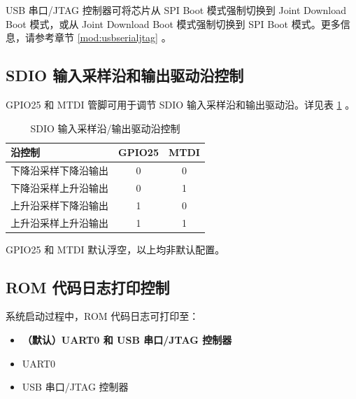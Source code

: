 \documentclass[main\_\_CN.tex]{subfiles}
\begin{document}
USB 串口/JTAG 控制器可将芯片从 SPI Boot 模式强制切换到 Joint Download Boot 模式，或从 Joint Download Boot 模式强制切换到 SPI Boot 模式。更多信息，请参考章节 \ref{mod:usbserialjtag} \textit{}。

\subsection{SDIO 输入采样沿和输出驱动沿控制}

GPIO25 和 MTDI 管脚可用于调节 SDIO 输入采样沿和输出驱动沿。详见表 \ref{tab:bootctrl-sdio-strapping} \textit{}。

\begin{table}[H]
    \centering
    \caption{SDIO 输入采样沿/输出驱动沿控制}
   \label{tab:bootctrl-sdio-strapping}

    \begin{threeparttable}
    \begin{tabular}{ | l | c | c| }
    \hline
        \rowcolor{lightgray}
        \textbf{沿控制} & \textbf{GPIO25} & \textbf{MTDI} \\\hline

        下降沿采样下降沿输出 & 0 & 0 \\\hline
        下降沿采样上升沿输出 & 0 & 1 \\\hline
        上升沿采样下降沿输出 & 1 & 0 \\\hline
        上升沿采样上升沿输出 & 1 & 1 \\\hline
        \end{tabular}

        \begin{tablenotes}
            \item[1] GPIO25 和 MTDI 默认浮空，以上均非默认配置。
        \end{tablenotes}

     \end{threeparttable}
\end{table}

\subsection{ROM 代码日志打印控制}

系统启动过程中，ROM 代码日志可打印至：

\begin{itemize}
    \item \textbf{（默认）UART0 和 USB 串口/JTAG 控制器}
    \item UART0
    \item USB 串口/JTAG 控制器
\end{itemize}
\end{document}
